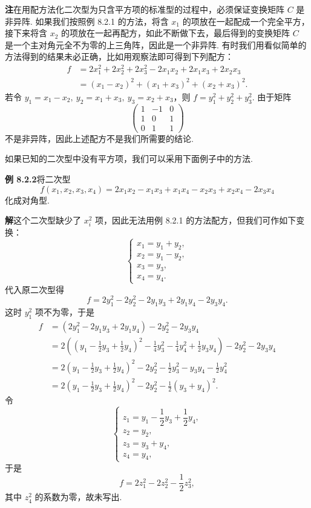 \documentclass[UTF8, 12pt, fontset=fandol, oneside]{ctexart}
\begin{document}
\noindent\textbf{注}\quad 在用配方法化二次型为只含平方项的标准型的过程中，必须保证变换矩阵 $C$ 是非异阵. 如果我们按照例 8.2.1 的方法，将含 $x_1$ 的项放在一起配成一个完全平方，接下来将含 $x_2$ 的项放在一起再配方，如此不断做下去，最后得到的变换矩阵 $C$ 是一个主对角元全不为零的上三角阵，因此是一个非异阵. 有时我们用看似简单的方法得到的结果未必正确，比如用观察法即可得到下列配方：
\[
\begin{aligned}
f&=2x_1^2+2x_2^2+2x_3^2-2x_1x_2+2x_1x_3+2x_2x_3\\
&=(x_1-x_2)^2+(x_1+x_3)^2+(x_2+x_3)^2.
\end{aligned}
\]
若令 $y_1=x_1-x_2,\ y_2=x_1+x_3,\ y_3=x_2+x_3$，则 $f=y_1^2+y_2^2+y_3^2$. 由于矩阵
\[
\left(\begin{array}{ccc}
1&-1&0\\
1&0&1\\
0&1&1
\end{array}\right)
\]
不是非异阵，因此上述配方不是我们所需要的结论.

如果已知的二次型中没有平方项，我们可以采用下面例子中的方法.

\noindent\textbf{例 8.2.2}\quad 将二次型
\[
f(x_1,x_2,x_3,x_4)=2x_1x_2-x_1x_3+x_1x_4-x_2x_3+x_2x_4-2x_3x_4
\]
化成对角型.

\noindent\textbf{解}\quad 这个二次型缺少了 $x_i^2$ 项，因此无法用例 8.2.1 的方法配方，但我们可作如下变换：
\[
\left\{\begin{array}{l}
x_1=y_1+y_2,\\
x_2=y_1-y_2,\\
x_3=y_3,\\
x_4=y_4.
\end{array}\right.
\]
代入原二次型得
\[
f=2y_1^2-2y_2^2-2y_1y_3+2y_1y_4-2y_3y_4.
\]
这时 $y_1^2$ 项不为零，于是
\[
\begin{aligned}
f&=(2y_1^2-2y_1y_3+2y_1y_4)-2y_2^2-2y_3y_4\\
&=2\left(\left(y_1-\frac12y_3+\frac12y_4\right)^2-\frac14y_3^2-\frac14y_4^2+\frac12y_3y_4\right)-2y_2^2-2y_3y_4\\
&=2\left(y_1-\frac12y_3+\frac12y_4\right)^2-2y_2^2-\frac12y_3^2-y_3y_4-\frac12y_4^2\\
&=2\left(y_1-\frac12y_3+\frac12y_4\right)^2-2y_2^2-\frac12(y_3+y_4)^2.
\end{aligned}
\]
令
\[
\left\{\begin{array}{l}
z_1=y_1-\dfrac12y_3+\dfrac12y_4,\\
z_2=y_2,\\
z_3=y_3+y_4,\\
z_4=y_4,
\end{array}\right.
\]
于是
\[
f=2z_1^2-2z_2^2-\frac12z_3^2,
\]
其中 $z_4^2$ 的系数为零，故未写出.
\end{document}
